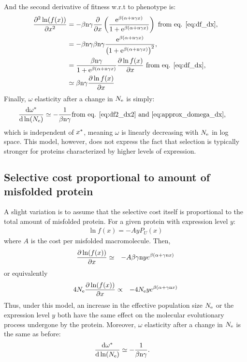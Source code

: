 \documentclass{article}
\begin{document}
And the second derivative of fitness w.r.t to phenotype is:
\begin{align}
\frac{\partial^2 \ln (f(x))}{\partial x^2} & = - \beta \text{n} \gamma \frac{\partial}{\partial x} \left( \frac{\mathrm{e}^{\beta(\alpha + \text{n} \gamma x)}}{1 + \mathrm{e}^{\beta(\alpha + \text{n} \gamma x)}} \right) \text{ from eq. \ref{eq:df_dx}}, \\
 & = - \beta \text{n} \gamma  \beta \text{n} \gamma \frac{\mathrm{e}^{\beta(\alpha + \text{n} \gamma x)}}{\left( 1 + \mathrm{e}^{\beta(\alpha + \text{n} \gamma x)}\right)^2}, \\
 & = \frac{\beta \text{n} \gamma}{1 + \mathrm{e}^{\beta(\alpha + \text{n} \gamma x)}} \frac{ \partial \ln f(x) }{\partial x} \text{ from eq. \ref{eq:df_dx}} \label{eq:df2_dx2}, \\
 & \simeq \beta \text{n} \gamma \frac{ \partial \ln f(x) }{\partial x} 
\end{align}
Finally, $\omega$ elasticity after a change in $N_{\mathrm{e}}$ is simply:
\begin{align}
\frac{ \mathrm{d} \omega^{*}}{\mathrm{d} \ln (N_{\mathrm{e}})} & \simeq - \frac{1}{\beta \text{n} \gamma} \text{from eq. \ref{eq:df2_dx2} and \ref{eq:approx_domega_dx}},
\end{align}
which is independent of $x^{*}$, meaning $\omega$ is linearly decreasing with $N_{\mathrm{e}}$ in log space.
This model, however, does not express the fact that selection is typically stronger for proteins characterized by higher levels of expression. 
\subsection{Selective cost proportional to amount of misfolded protein}
A slight variation is to assume that the selective cost itself is proportional to the total amount of misfolded protein. For a given protein with expression level $y$:
\begin{eqnarray}
\ln f(x) = - A y P_{U} (x)
\end{eqnarray}
where $A$ is the cost per misfolded macromolecule. Then, 
\begin{eqnarray}
\frac{\partial \ln (f(x))}{\partial x} &\simeq& -A \beta \gamma \text{n} y  e^{\beta(\alpha + \gamma \text{n} x)}
\end{eqnarray}
or equivalently
\begin{eqnarray}
4 N_{\mathrm{e}} \frac{\partial \ln (f(x))}{\partial x} &\propto& -4 N_{\mathrm{e}} y e^{\beta(\alpha + \gamma \text{n} x)}
\end{eqnarray}
Thus, under this model, an increase in the effective population size $N_{\mathrm{e}}$ or the expression level $y$ both have the same effect on the molecular evolutionary process undergone by the protein.
Moreover, $\omega$ elasticity after a change in $N_{\mathrm{e}}$ is the same as before:
\begin{align}
\frac{ \mathrm{d} \omega^{*}}{\mathrm{d} \ln (N_{\mathrm{e}})} & \simeq - \frac{1}{\beta \text{n} \gamma}.
\end{align}
\end{document}
